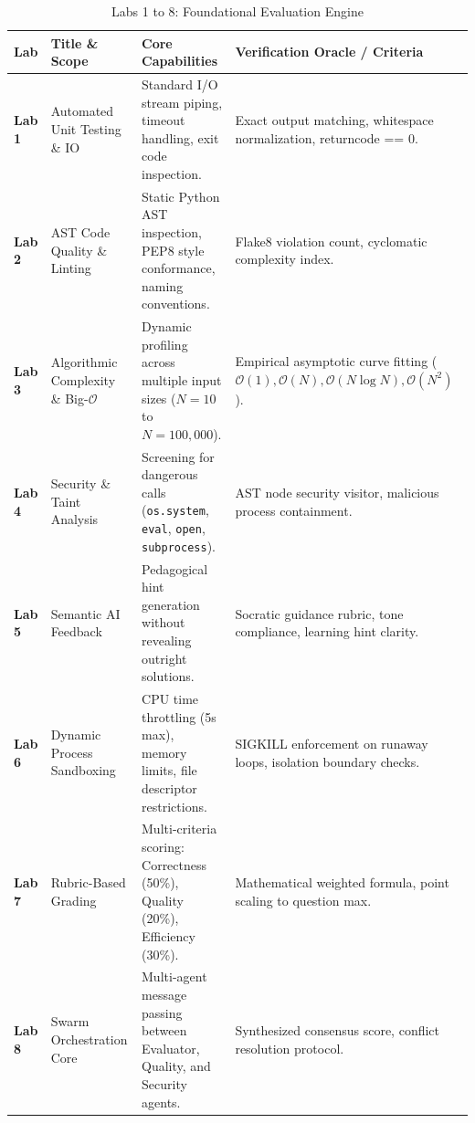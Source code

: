 \documentclass[12pt, a4paper]{report}
\begin{document}
\begin{table}[H]
\centering
\caption{Labs 1 to 8: Foundational Evaluation Engine}
\renewcommand{\arraystretch}{1.2}
\small
\begin{tabular}{|L{1.5cm}|L{3.8cm}|L{5.0cm}|L{5.2cm}|}
\hline
{}
\color{white}\textbf{Lab} & \color{white}\textbf{Title \& Scope} & \color{white}\textbf{Core Capabilities} & \color{white}\textbf{Verification Oracle / Criteria} \\
\hline
\textbf{Lab 1} & Automated Unit Testing \& IO & Standard I/O stream piping, timeout handling, exit code inspection. & Exact output matching, whitespace normalization, returncode == 0. \\
\hline
{}
\textbf{Lab 2} & AST Code Quality \& Linting & Static Python AST inspection, PEP8 style conformance, naming conventions. & Flake8 violation count, cyclomatic complexity index. \\
\hline
\textbf{Lab 3} & Algorithmic Complexity \& Big-$\mathcal{O}$ & Dynamic profiling across multiple input sizes ($N=10$ to $N=100{,}000$). & Empirical asymptotic curve fitting ($\mathcal{O}(1), \mathcal{O}(N), \mathcal{O}(N \log N), \mathcal{O}(N^2)$). \\
\hline
{}
\textbf{Lab 4} & Security \& Taint Analysis & Screening for dangerous calls (\texttt{os.system}, \texttt{eval}, \texttt{open}, \texttt{subprocess}). & AST node security visitor, malicious process containment. \\
\hline
\textbf{Lab 5} & Semantic AI Feedback & Pedagogical hint generation without revealing outright solutions. & Socratic guidance rubric, tone compliance, learning hint clarity. \\
\hline
{}
\textbf{Lab 6} & Dynamic Process Sandboxing & CPU time throttling (5s max), memory limits, file descriptor restrictions. & SIGKILL enforcement on runaway loops, isolation boundary checks. \\
\hline
\textbf{Lab 7} & Rubric-Based Grading & Multi-criteria scoring: Correctness (50\%), Quality (20\%), Efficiency (30\%). & Mathematical weighted formula, point scaling to question max. \\
\hline
{}
\textbf{Lab 8} & Swarm Orchestration Core & Multi-agent message passing between Evaluator, Quality, and Security agents. & Synthesized consensus score, conflict resolution protocol. \\
\hline
\end{tabular}
\end{table}
\end{document}
